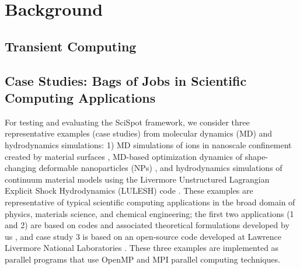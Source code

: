 
\section{Background}

\subsection{Transient Computing}



%
\subsection{Case Studies: Bags of Jobs in Scientific Computing Applications}

\begin{comment}
Describe the kind of computation. DONE

Scaling properties. Almost perfectly scalable with O(n) communication? UNCLEAR WHAT IS MEANT TO BE DONE HERE

This can be a like a case study of parallel scientific simulations.
Will help relate to parameters etc with more concrete examples. DONE

Bag of jobs.
Why multiple runs: parameter sweeps, search, or just multiple times to get confidence intervals and stable results in case of randomness. 
DONE I THINK
\end{comment}

For testing and evaluating the SciSpot framework, we consider three representative examples (case studies) from molecular dynamics (MD) and hydrodynamics simulations: 1) MD simulations of ions in nanoscale confinement created by material surfaces \cite{jjzo1,kadupitiya2017}, MD-based optimization dynamics of shape-changing deformable nanoparticles (NPs) \cite{jto1,jyto}, and hydrodynamics simulations of continuum material models using the Livermore Unstructured Lagrangian Explicit Shock Hydrodynamics (LULESH) code \cite{IPDPS13:LULESH,LULESH2:changes}. These examples are representative of typical scientific computing applications in the broad domain of physics, materials science, and chemical engineering; the first two applications (1 and 2) are based on codes and associated theoretical formulations developed by us \cite{jso1,jso2,solis2013generating,jjzo1,jto1,jyto}, and case study 3 is based on an open-source code developed at Lawrence Livermore National Laboratories \cite{IPDPS13:LULESH,LULESH:spec}. These three examples are implemented as parallel programs that use OpenMP and MPI parallel computing techniques.


